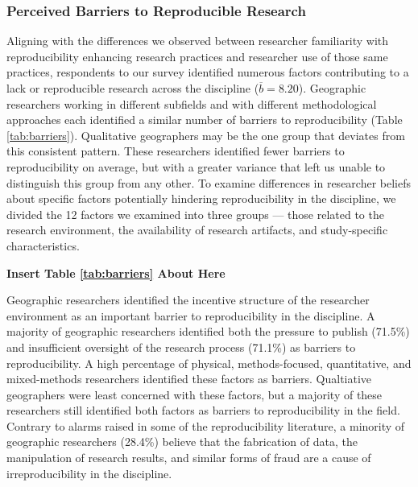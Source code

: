 \documentclass[]{interact}
\theoremstyle{plain}%
\theoremstyle{definition}
\theoremstyle{remark}
\begin{document}
\subsubsection*{Perceived Barriers to Reproducible Research}
Aligning with the differences we observed between researcher familiarity with reproducibility enhancing research practices and researcher use of those same practices, respondents to our survey identified numerous factors contributing to a lack or reproducible research across the discipline ($\overline{b}=8.20$). 
Geographic researchers working in different subfields and with different methodological approaches each identified a similar number of barriers to reproducibility (Table \ref{tab:barriers}).
Qualitative geographers may be the one group that deviates from this consistent pattern. 
These researchers identified fewer barriers to reproducibility on average, but with a greater variance that left us unable to distinguish this group from any other.
To examine differences in researcher beliefs about specific factors potentially hindering reproducibility in the discipline, we divided the 12 factors we examined into three groups --- those related to the research environment, the availability of research artifacts, and study-specific characteristics. 

\begin{center}
\textbf{Insert Table \ref{tab:barriers} About Here}
\end{center}

Geographic researchers identified the incentive structure of the researcher environment as an important barrier to reproducibility in the discipline.
A majority of geographic researchers identified both the pressure to publish (71.5\%) and insufficient oversight of the research process (71.1\%) as barriers to reproducibility.
A high percentage of physical, methods-focused, quantitative, and mixed-methods researchers identified these factors as barriers. 
Qualtiative geographers were least concerned with these factors, but a majority of these researchers still identified both factors as barriers to reproducibility in the field.
Contrary to alarms raised in some of the reproducibility literature, a minority of geographic researchers (28.4\%) believe that the fabrication of data, the manipulation of research results, and similar forms of fraud are a cause of irreproducibility in the discipline.
\end{document}
